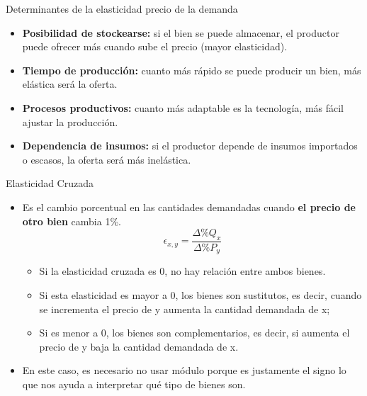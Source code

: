 \documentclass{beamer}
\begin{document}
\begin{frame}{Determinantes de la elasticidad precio de la demanda}
      \begin{itemize}
          \item \textbf{Posibilidad de stockearse:} si el bien se puede almacenar, el productor puede ofrecer más cuando sube el precio (mayor elasticidad).    
          \item \textbf{Tiempo de producción:} cuanto más rápido se puede producir un bien, más elástica será la oferta.
          \item \textbf{Procesos productivos:} cuanto más adaptable es la tecnología, más fácil ajustar la producción.
          \item \textbf{Dependencia de insumos:} si el productor depende de insumos importados o escasos, la oferta será más inelástica.
        \end{itemize}
\end{frame}

\begin{frame}{Elasticidad Cruzada}
    \begin{itemize}
        \item Es el cambio porcentual en las cantidades demandadas cuando \textbf{el precio de otro bien} cambia 1\%.
        \begin{equation*}
            \epsilon_{x,y} = \frac{\Delta \% Q_x}{\Delta \% P_y}
        \end{equation*}
            \begin{itemize}
            \item Si la elasticidad cruzada es 0, no hay relación entre ambos bienes.
            \item Si esta elasticidad es mayor a 0, los bienes son sustitutos, es decir, cuando se incrementa el precio de y aumenta la cantidad demandada de x; 
            \item Si es menor a 0, los bienes son complementarios, es decir, si aumenta el precio de y baja la cantidad demandada de x.
            \end{itemize}
        \item En este caso, es necesario no usar módulo porque es justamente el signo lo que nos ayuda a interpretar qué tipo de bienes son.
    \end{itemize}
\end{frame}
\end{document}
